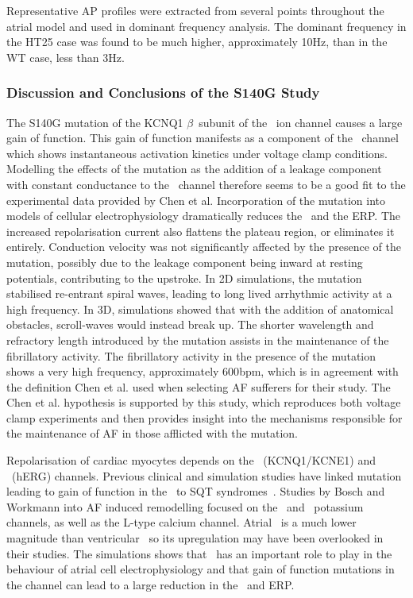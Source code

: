 Representative AP profiles were extracted from several points throughout the
atrial model and used in dominant frequency analysis.
The dominant frequency in the HT25 case was found to be much higher,
approximately \unit{10}{Hz}, than in the WT case, less than \unit{3}{Hz}.

\subsubsection{Discussion and Conclusions of the S140G Study}

The S140G mutation of the KCNQ1 $\beta$\ subunit of the \ ion channel
causes a large gain of function.
This gain of function manifests as a component of the \ channel which
shows instantaneous activation kinetics under voltage clamp conditions.
Modelling the effects of the mutation as the addition of a leakage component
with constant conductance to the \ channel therefore seems to be a good
fit to the experimental data provided by Chen et al.
Incorporation of the mutation into models of cellular electrophysiology
dramatically reduces the \apd\ and the ERP.
The increased repolarisation current also flattens the plateau region, or
eliminates it entirely.
Conduction velocity was not significantly affected by the presence of the
mutation, possibly due to the leakage component being inward at resting
potentials, contributing to the upstroke.
In 2D simulations, the mutation stabilised re-entrant spiral waves, leading to
long lived arrhythmic activity at a high frequency.
In 3D, simulations showed that with the addition of anatomical obstacles,
scroll-waves would instead break up.
The shorter wavelength and refractory length introduced by the mutation assists
in the maintenance of the fibrillatory activity.
The fibrillatory activity in the presence of the mutation shows a very high
frequency, approximately \unit{600}{bpm}, which is in agreement with the
definition Chen et al. used when selecting AF sufferers for their study.
The Chen et al. hypothesis is supported by this study, which reproduces both
voltage clamp experiments and then provides insight into the mechanisms
responsible for the maintenance of AF in those afflicted with the mutation.

Repolarisation of cardiac myocytes depends on the \ (KCNQ1/KCNE1) and
\ (hERG) channels.
Previous clinical and simulation studies have linked mutation leading to
gain of function in the \ to SQT syndromes~\cite{Brugada2004,Hong2005}.
Studies by Bosch and Workmann into AF induced remodelling focused on the
\ and \ potassium channels, as well as the L-type calcium channel.
Atrial \ is a much lower magnitude than ventricular \ so its
upregulation may have been overlooked in their studies.
The simulations shows that \ has an important role to play in the behaviour
of atrial cell electrophysiology and that gain of function mutations in the
channel can lead to a large reduction in the \apd\ and ERP.

